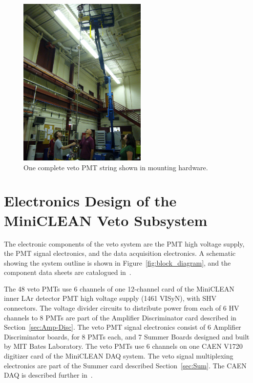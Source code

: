 \documentclass{JINST}
\begin{document}
\begin{figure}[ht]
\begin{center}
\includegraphics[width=2.5in]{graphics/pmtstring.jpg}
\caption{One complete veto PMT string shown in mounting hardware.
\label{fig:vetopmtstringpic}}
\end{center}
\end{figure}


\section{Electronics Design of the MiniCLEAN Veto Subsystem}
\label{sec:electronics_design}
%
The electronic components of the veto system are the PMT high voltage supply, the PMT signal electronics, and the data acquisition electronics.  A schematic showing the system outline is shown in Figure~\ref{fig:block_diagram}, and the component data sheets are catalogued in~\cite{ref:vetocomponentdatasheets}.

The 48 veto PMTs use 6 channels of one 12-channel card of the
MiniCLEAN inner LAr detector PMT high voltage supply (1461 VISyN),
with SHV connectors.  The voltage divider circuits to distribute power
from each of 6 HV channels to 8 PMTs are part of the Amplifier
Discriminator card described in Section~\ref{sec:Amp-Disc}.  The veto
PMT signal electronics consist of 6 Amplifier Discriminator boards,
for 8 PMTs each, and 7 Summer Boards designed and built by MIT Bates
Laboratory.  The veto PMTs use 6 channels on one CAEN V1720 digitizer
card of the MiniCLEAN DAQ system.  The veto signal multiplexing
electronics are part of the Summer card described
Section~\ref{sec:Sum}.  The CAEN DAQ is described further
in~\cite{ref:gastler_thesis}.
\end{document}

